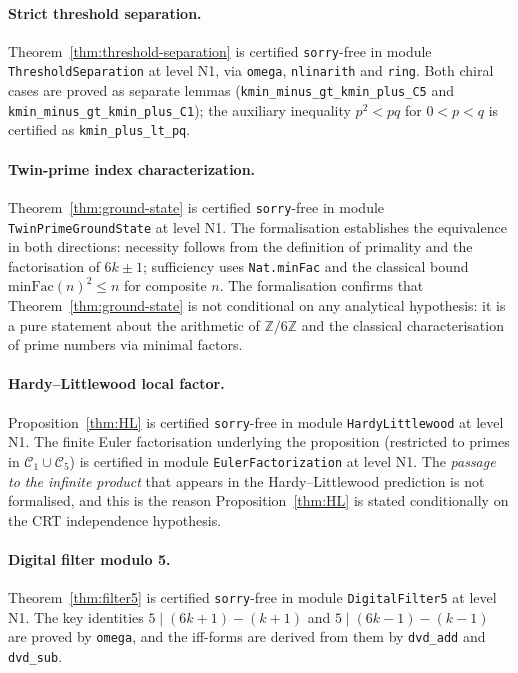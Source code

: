 \documentclass[11pt]{amsart}
\numberwithin{equation}{section}
\newcommand{\ZZ}{\mathbb{Z}}
\newcommand{\Cone}{\mathcal{C}_1}
\newcommand{\Cfive}{\mathcal{C}_5}
\theoremstyle{plain}
\theoremstyle{definition}
\begin{document}
\paragraph{Strict threshold separation.}
Theorem~\ref{thm:threshold-separation} is certified \texttt{sorry}-free
in module \texttt{ThresholdSeparation} at level N1, via
\texttt{omega}, \texttt{nlinarith} and \texttt{ring}. Both chiral
cases are proved as separate lemmas
(\texttt{kmin\_minus\_gt\_kmin\_plus\_C5} and
\texttt{kmin\_minus\_gt\_kmin\_plus\_C1}); the auxiliary inequality
$p^2<pq$ for $0<p<q$ is certified as
\texttt{kmin\_plus\_lt\_pq}.

\paragraph{Twin-prime index characterization.}
Theorem~\ref{thm:ground-state} is certified \texttt{sorry}-free in
module \texttt{TwinPrimeGroundState} at level N1. The formalisation
establishes the equivalence in both directions: necessity follows
from the definition of primality and the factorisation of
$6k\pm 1$; sufficiency uses \texttt{Nat.minFac} and the classical
bound $\mathrm{minFac}(n)^2\le n$ for composite $n$. The formalisation
confirms that Theorem~\ref{thm:ground-state} is not conditional on
any analytical hypothesis: it is a pure statement about the
arithmetic of $\ZZ/6\ZZ$ and the classical characterisation of prime
numbers via minimal factors.

\paragraph{Hardy--Littlewood local factor.}
Proposition~\ref{thm:HL} is certified \texttt{sorry}-free in module
\texttt{HardyLittlewood} at level N1. The finite Euler factorisation
underlying the proposition (restricted to primes in
$\Cone\cup\Cfive$) is certified in module \texttt{EulerFactorization}
at level N1. The \emph{passage to the infinite product} that appears
in the Hardy--Littlewood prediction is not formalised, and this is
the reason Proposition~\ref{thm:HL} is stated conditionally on the
CRT independence hypothesis.

\paragraph{Digital filter modulo 5.}
Theorem~\ref{thm:filter5} is certified \texttt{sorry}-free in module
\texttt{DigitalFilter5} at level N1. The key identities
$5\mid(6k+1)-(k+1)$ and $5\mid(6k-1)-(k-1)$ are proved by
\texttt{omega}, and the iff-forms are derived from them by
\texttt{dvd\_add} and \texttt{dvd\_sub}.
\end{document}

